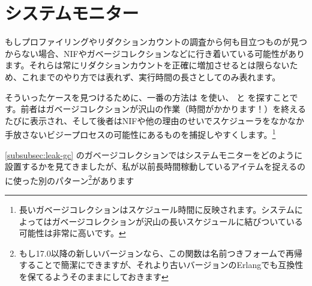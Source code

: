 \section{システムモニター}
\label{sec:cpu-system-monitors}

もしプロファイリングやリダクションカウントの調査から何も目立つものが見つからない場合、NIFやガベージコレクションなどに行き着いている可能性があります。それらは常にリダクションカウントを正確に増加させるとは限らないため、これまでのやり方では表れず、実行時間の長さとしてのみ表れます。

そういったケースを見つけるために、一番の方法は  を使い、  と  を探すことです。前者はガベージコレクションが沢山の作業（時間がかかります！）を終えるたびに表示され、そして後者はNIFや他の理由のせいでスケジューラをなかなか手放さないビジープロセスの可能性にあるものを捕捉しやすくします。\footnote{長いガベージコレクションはスケジュール時間に反映されます。システムによってはガベージコレクションが沢山の長いスケジュールに結びついている可能性は非常に高いです。}

\ref{subsubsec:leak-gc} のガベージコレクションではシステムモニターをどのように設置するかを見てきましたが、私が以前長時間稼動しているアイテムを捉えるのに使った別のパターン\footnote{もし17.0以降の新しいバージョンなら、この関数は名前つきフォームで再帰することで簡潔にできますが、それより古いバージョンのErlangでも互換性を保てるようそのままにしておきます}があります

